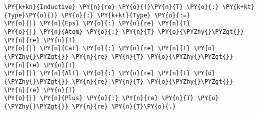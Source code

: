 \begin{Verbatim}[commandchars=\\\{\}]
\PY{k+kn}{Inductive} \PY{n}{re} \PY{o}{(}\PY{n}{T} \PY{o}{:} \PY{k+kt}{Type}\PY{o}{)} \PY{o}{:} \PY{k+kt}{Type} \PY{o}{:=}
\PY{o}{|} \PY{n}{Eps} \PY{o}{:} \PY{n}{re} \PY{n}{T}
\PY{o}{|} \PY{n}{Atom} \PY{o}{:} \PY{n}{T} \PY{o}{\PYZhy{}\PYZgt{}} \PY{n}{re} \PY{n}{T}
\PY{o}{|} \PY{n}{Cat} \PY{o}{:} \PY{n}{re} \PY{n}{T} \PY{o}{\PYZhy{}\PYZgt{}} \PY{n}{re} \PY{n}{T} \PY{o}{\PYZhy{}\PYZgt{}} \PY{n}{re} \PY{n}{T}
\PY{o}{|} \PY{n}{Alt} \PY{o}{:} \PY{n}{re} \PY{n}{T} \PY{o}{\PYZhy{}\PYZgt{}} \PY{n}{re} \PY{n}{T} \PY{o}{\PYZhy{}\PYZgt{}} \PY{n}{re} \PY{n}{T}
\PY{o}{|} \PY{n}{Plus} \PY{o}{:} \PY{n}{re} \PY{n}{T} \PY{o}{\PYZhy{}\PYZgt{}} \PY{n}{re} \PY{n}{T}\PY{o}{.}
\end{Verbatim}
